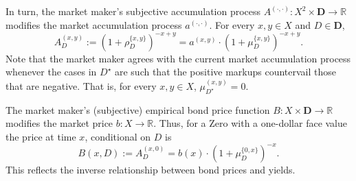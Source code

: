 \documentclass[ecta,nameyear,draft]{econsocart}
\newcommand{\R}{\mathbb R}
\newcommand{\mbbd}{{\mathbf D}}
\newcommand{\past}{{D^\star}}
\newcommand{\xy}{{(x, y)}}
\newcommand{\dd}{{(\cdot,\cdot)}}
\theoremstyle{plain}
\theoremstyle{remark}
\begin{document}
In turn, the market maker's subjective accumulation process ${A^{\dd}}: X^2
\times \mbbd \rightarrow \R$ modifies the market accumulation process
$a^{\dd}$. For every $x, y \in X$ and $D \in\mbbd$,
\begin{equation*}
  {A}^{\xy}_{D} := \left(1 + \rho^{\{x,y\}}_{D}\right)^{-x + y} = a^{\xy} \cdot
  \left(1 + \mu^{\{x, y\}}_{D}\right)^{-x + y}.
\end{equation*}
Note that the market maker agrees with the current market accumulation process
whenever the cases in $\past$ are such that the positive markups countervail
those that are negative. That is, for every $x, y \in X$, ${\mu}^{\xy}_{\past}
= 0$.

The market maker's (subjective) empirical bond price function $B : X \times
\mbbd \rightarrow \R$ modifies the market price $b: X \rightarrow \R$. Thus,
for a Zero with a one-dollar face value the price at time $x$, conditional on
$D$ is 
\begin{equation*} B(x,D) := {A}^{(x, 0)}_{D} =
  b(x) \cdot \left(1 + \mu^{\{0,x\}}_{D} \right)^{-x} .
\end{equation*}
This reflects the inverse relationship between bond prices and yields.  
\end{document}
